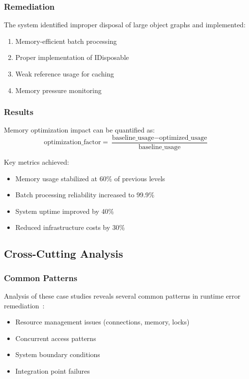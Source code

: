 \subsubsection{Remediation}
The system identified improper disposal of large object graphs and implemented:
\begin{enumerate}
    \item Memory-efficient batch processing
    \item Proper implementation of IDisposable
    \item Weak reference usage for caching
    \item Memory pressure monitoring
\end{enumerate}

\subsubsection{Results}
Memory optimization impact can be quantified as:
\begin{equation}
\text{optimization\_factor} = \frac{\text{baseline\_usage} - \text{optimized\_usage}}{\text{baseline\_usage}}
\end{equation}

Key metrics achieved:
\begin{itemize}
    \item Memory usage stabilized at 60\% of previous levels
    \item Batch processing reliability increased to 99.9\%
    \item System uptime improved by 40\%
    \item Reduced infrastructure costs by 30\%
\end{itemize}

\subsection{Cross-Cutting Analysis}

\subsubsection{Common Patterns}
Analysis of these case studies reveals several common patterns in runtime error remediation~\cite{error_patterns_2024}:
\begin{itemize}
    \item Resource management issues (connections, memory, locks)
    \item Concurrent access patterns
    \item System boundary conditions
    \item Integration point failures
\end{itemize}

